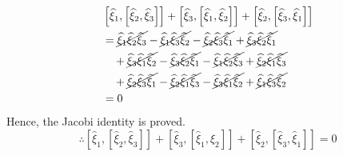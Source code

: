 \begin{align*}
     &
    \left[\widehat{\xi}_{1},\left[\widehat{\xi}_{2}, \widehat{\xi}_{3}\right]\right]+\left[\widehat{\xi}_{3},\left[\widehat{\xi}_{1}, \widehat{\xi}_{2}\right]\right]+\left[\widehat{\xi}_{2},\left[\widehat{\xi}_{3}, \widehat{\xi}_{1}\right]\right]
    \\ & =
    \cancel{\widehat{\xi}_{1} \widehat{\xi}_{2} \widehat{\xi}_{3}} - \cancel{\widehat{\xi}_{1} \widehat{\xi}_{3} \widehat{\xi}_{2}} - \cancel{\widehat{\xi}_{2} \widehat{\xi}_{3} \widehat{\xi}_{1}} + \cancel{\widehat{\xi}_{3} \widehat{\xi}_{2} \widehat{\xi}_{1}}
    \\ & \quad +
    \cancel{\widehat{\xi}_{3} \widehat{\xi}_{1} \widehat{\xi}_{2}} - \cancel{\widehat{\xi}_{3} \widehat{\xi}_{2} \widehat{\xi}_{1}} - \cancel{\widehat{\xi}_{1} \widehat{\xi}_{2} \widehat{\xi}_{3}} + \cancel{\widehat{\xi}_{2} \widehat{\xi}_{1} \widehat{\xi}_{3}}
    \\ & \quad +
    \cancel{\widehat{\xi}_{2} \widehat{\xi}_{3} \widehat{\xi}_{1}} - \cancel{\widehat{\xi}_{2} \widehat{\xi}_{1} \widehat{\xi}_{3}} - \cancel{\widehat{\xi}_{3} \widehat{\xi}_{1} \widehat{\xi}_{2}} + \cancel{\widehat{\xi}_{1} \widehat{\xi}_{3} \widehat{\xi}_{2}}
    \\ & =
    0
\end{align*}
Hence, the Jacobi identity is proved.
\begin{equation*}
    \therefore
    \boxed{
        \left[\widehat{\xi}_{1},\left[\widehat{\xi}_{2}, \widehat{\xi}_{3}\right]\right]+\left[\widehat{\xi}_{3},\left[\widehat{\xi}_{1}, \widehat{\xi}_{2}\right]\right]+\left[\widehat{\xi}_{2},\left[\widehat{\xi}_{3}, \widehat{\xi}_{1}\right]\right]=0
    }
\end{equation*}
